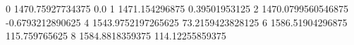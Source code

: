 0 1470.75927734375 0.0
1 1471.154296875 0.39501953125
2 1470.0799560546875 -0.6793212890625
4 1543.9752197265625 73.2159423828125
6 1586.51904296875 115.759765625
8 1584.8818359375 114.12255859375
